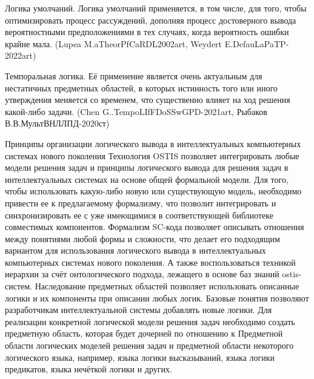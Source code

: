 \begin{frame}{}
    \begin{textitemize}
        \item Логика умолчаний. Логика умолчаний применяется, в том числе, для того, чтобы оптимизировать процесс рассуждений, дополняя процесс достоверного вывода вероятностными предположениями в тех случаях, когда вероятность ошибки крайне мала. (Lupea M.aTheorPfCaRDL2002art, Weydert E.DefauLaPaTP-2022art)
        \item Темпоральная логика. Её применение является очень актуальным для нестатичных предметных областей, в которых истинность того или иного утверждения меняется со временем, что существенно влияет на ход решения какой-либо задачи. (Chen G..TempoLIfFDoSSwGPD-2021art, Рыбаков В.В.МультВНЛЛПД-2020ст)        
    \end{textitemize}  
\end{frame}


\begin{frame}{\large Принципы организации логического вывода в интеллектуальных компьютерных системах нового поколения}
    \vspace{15mm}
        Технология OSTIS позволяет интегрировать любые модели решения задач и принципы логического вывода для решения задач в интеллектуальных системах на основе общей формальной модели. Для того, чтобы использовать какую-либо новую или существующую модель, необходимо привести ее к предлагаемому формализму, что позволит интегрировать и синхронизировать ее с уже имеющимися в соответствующей библиотеке совместимых компонентов. Формализм SC-кода позволяет описывать отношения между понятиями любой формы и сложности, что делает его подходящим вариантом для использования логического вывода в интеллектуальных компьютерных системах нового поколения. А также воспользоваться техникой иерархии за счёт онтологического подхода, лежащего в основе баз знаний ostis-систем.
        Наследование предметных областей позволяет использовать описанные логики и их компоненты при описании любых логик. Базовые понятия позволяют разработчикам интеллектуальной системы добавлять новые логики. Для реализации конкретной логической модели решения задач необходимо создать предметную область, которая будет дочерней по отношению к Предметной области логических моделей решения задач и предметной области некоторого логического языка, например, языка логики высказываний, языка логики предикатов, языка нечёткой логики и других.
\end{frame}

